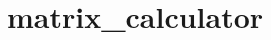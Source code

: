 \chapter{matrix\+\_\+calculator}
\hypertarget{md_README}{}\label{md_README}
\label{md_README_autotoc_md0}%
%
